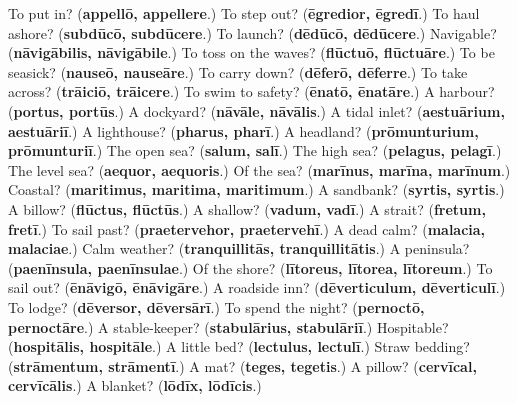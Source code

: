 \begin{tcolorbox}[breakable,colback=teal!4,colframe=teal!35!black,title={Before you move on}]
To put in? (\textbf{appellō, appellere}.) To step out? (\textbf{ēgredior, ēgredī}.) To haul ashore? (\textbf{subdūcō, subdūcere}.) To launch? (\textbf{dēdūcō, dēdūcere}.) Navigable? (\textbf{nāvigābilis, nāvigābile}.) To toss on the waves? (\textbf{flūctuō, flūctuāre}.) To be seasick? (\textbf{nauseō, nauseāre}.) To carry down? (\textbf{dēferō, dēferre}.) To take across? (\textbf{trāiciō, trāicere}.) To swim to safety? (\textbf{ēnatō, ēnatāre}.) A harbour? (\textbf{portus, portūs}.) A dockyard? (\textbf{nāvāle, nāvālis}.) A tidal inlet? (\textbf{aestuārium, aestuāriī}.) A lighthouse? (\textbf{pharus, pharī}.) A headland? (\textbf{prōmunturium, prōmunturiī}.) The open sea? (\textbf{salum, salī}.) The high sea? (\textbf{pelagus, pelagī}.) The level sea? (\textbf{aequor, aequoris}.) Of the sea? (\textbf{marīnus, marīna, marīnum}.) Coastal? (\textbf{maritimus, maritima, maritimum}.) A sandbank? (\textbf{syrtis, syrtis}.) A billow? (\textbf{flūctus, flūctūs}.) A shallow? (\textbf{vadum, vadī}.) A strait? (\textbf{fretum, fretī}.) To sail past? (\textbf{praetervehor, praetervehī}.) A dead calm? (\textbf{malacia, malaciae}.) Calm weather? (\textbf{tranquillitās, tranquillitātis}.) A peninsula? (\textbf{paenīnsula, paenīnsulae}.) Of the shore? (\textbf{lītoreus, lītorea, lītoreum}.) To sail out? (\textbf{ēnāvigō, ēnāvigāre}.) A roadside inn? (\textbf{dēverticulum, dēverticulī}.) To lodge? (\textbf{dēversor, dēversārī}.) To spend the night? (\textbf{pernoctō, pernoctāre}.) A stable-keeper? (\textbf{stabulārius, stabulāriī}.) Hospitable? (\textbf{hospitālis, hospitāle}.) A little bed? (\textbf{lectulus, lectulī}.) Straw bedding? (\textbf{strāmentum, strāmentī}.) A mat? (\textbf{teges, tegetis}.) A pillow? (\textbf{cervīcal, cervīcālis}.) A blanket? (\textbf{lōdīx, lōdīcis}.)
\end{tcolorbox}
